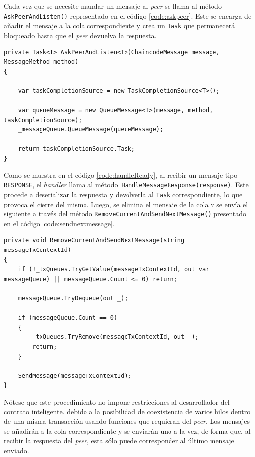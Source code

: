 Cada vez que se necesite mandar un mensaje al \textit{peer} se llama al método \texttt{AskPeerAndListen()} representado en el código \ref{code:askpeer}. Este se encarga de añadir el mensaje a la cola correspondiente y crea un \texttt{Task} que permanecerá bloqueado hasta que el \textit{peer} devuelva la respuesta. \\

\begin{lstlisting}[caption={Función \texttt{Handler.AskPeerAndListen<T>(...)}}, label={code:askpeer}]
private Task<T> AskPeerAndListen<T>(ChaincodeMessage message, MessageMethod method)
{

	var taskCompletionSource = new TaskCompletionSource<T>();
	
	var queueMessage = new QueueMessage<T>(message, method, taskCompletionSource);
	_messageQueue.QueueMessage(queueMessage);
	
	return taskCompletionSource.Task;
}
\end{lstlisting}


Como se muestra en el código \ref{code:handleReady}, al recibir un mensaje tipo \texttt{RESPONSE}, el \textit{handler} llama al método\texttt{ HandleMessageResponse(response)}. Este procede a deserializar la respuesta y devolverla al \texttt{Task} correspondiente, lo que provoca el cierre del mismo. Luego, se elimina el mensaje de la cola y se envía el siguiente a través del método 
\texttt{RemoveCurrentAndSendNextMessage()} presentado en el código \ref{code:sendnextmessage}.\\

\begin{lstlisting}[caption={Función \texttt{RemoveCurrentAndSendNextMessage(...)} }, label={code:sendnextmessage}]
 private void RemoveCurrentAndSendNextMessage(string messageTxContextId)
{
    if (!_txQueues.TryGetValue(messageTxContextId, out var messageQueue) || messageQueue.Count <= 0) return;

    messageQueue.TryDequeue(out _);

    if (messageQueue.Count == 0)
    {
        _txQueues.TryRemove(messageTxContextId, out _);
        return;
    }

    SendMessage(messageTxContextId);
}
\end{lstlisting}

Nótese que este procedimiento no impone restricciones al desarrollador del contrato inteligente, debido a la posibilidad de coexistencia de varios hilos dentro de una misma transacción usando funciones que requieran del \textit{peer}. Los mensajes se añadirán a la cola correspondiente y se enviarán uno a la vez, de forma que, al recibir la respuesta del \textit{peer}, esta sólo puede corresponder al último mensaje enviado.

